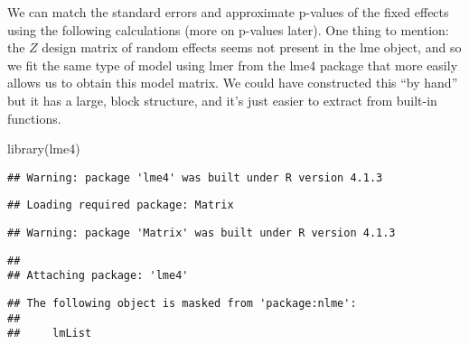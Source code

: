 \documentclass[
]{book}
\newenvironment{Shaded}{\begin{snugshade}}{\end{snugshade}}
\newcommand{\FunctionTok}[1]{\textcolor[rgb]{0.00,0.00,0.00}{#1}}
\newcommand{\NormalTok}[1]{#1}
\begin{document}
We can match the standard errors and approximate p-values of the fixed effects using the following calculations (more on p-values later). One thing to mention: the \(Z\) design matrix of random effects seems not present in the lme object, and so we fit the same type of model using lmer from the lme4 package that more easily allows us to obtain this model matrix. We could have constructed this ``by hand'' but it has a large, block structure, and it's just easier to extract from built-in functions.

\begin{Shaded}
\begin{Highlighting}[]
\FunctionTok{library}\NormalTok{(lme4)}
\end{Highlighting}
\end{Shaded}

\begin{verbatim}
## Warning: package 'lme4' was built under R version 4.1.3
\end{verbatim}

\begin{verbatim}
## Loading required package: Matrix
\end{verbatim}

\begin{verbatim}
## Warning: package 'Matrix' was built under R version 4.1.3
\end{verbatim}

\begin{verbatim}
## 
## Attaching package: 'lme4'
\end{verbatim}

\begin{verbatim}
## The following object is masked from 'package:nlme':
## 
##     lmList
\end{verbatim}
\end{document}
